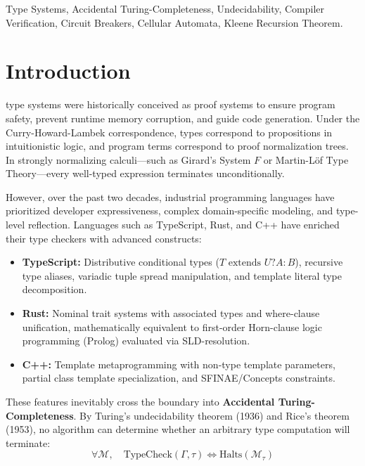 \documentclass[10pt,journal,compsoc]{IEEEtran}
\begin{document}
{\begin{IEEEkeywords}
Type Systems, Accidental Turing-Completeness, Undecidability, Compiler Verification, Circuit Breakers, Cellular Automata, Kleene Recursion Theorem.
\end{IEEEkeywords}}

\maketitle
\IEEEdisplaynontitleabstractindextext
\IEEEpeerreviewmaketitle

\section{Introduction}
 type systems were historically conceived as proof systems to ensure program safety, prevent runtime memory corruption, and guide code generation. Under the Curry-Howard-Lambek correspondence, types correspond to propositions in intuitionistic logic, and program terms correspond to proof normalization trees. In strongly normalizing calculi—such as Girard's System $F$ or Martin-L\"of Type Theory—every well-typed expression terminates unconditionally.

However, over the past two decades, industrial programming languages have prioritized developer expressiveness, complex domain-specific modeling, and type-level reflection. Languages such as TypeScript, Rust, and C++ have enriched their type checkers with advanced constructs:
\begin{itemize}
    \item \textbf{TypeScript:} Distributive conditional types ($T \text{ extends } U ? A : B$), recursive type aliases, variadic tuple spread manipulation, and template literal type decomposition.
    \item \textbf{Rust:} Nominal trait systems with associated types and where-clause unification, mathematically equivalent to first-order Horn-clause logic programming (Prolog) evaluated via SLD-resolution.
    \item \textbf{C++:} Template metaprogramming with non-type template parameters, partial class template specialization, and SFINAE/Concepts constraints.
\end{itemize}

These features inevitably cross the boundary into \textbf{Accidental Turing-Completeness}. By Turing's undecidability theorem (1936) and Rice's theorem (1953), no algorithm can determine whether an arbitrary type computation will terminate:
\begin{equation}
\forall \mathcal{M}, \quad \text{TypeCheck}(\Gamma, \tau) \iff \text{Halts}(\mathcal{M}_\tau)
\end{equation}
\end{document}
